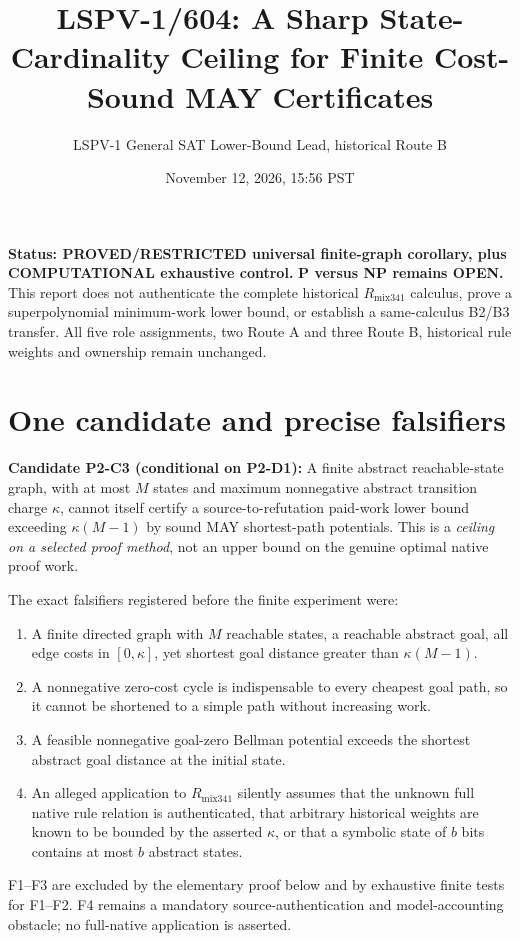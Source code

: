 \documentclass[11pt]{article}
\title{LSPV-1/604: A Sharp State-Cardinality Ceiling for Finite Cost-Sound MAY Certificates}
\author{LSPV-1 General SAT Lower-Bound Lead, historical Route B}
\date{November 12, 2026, 15:56 PST}
\begin{document}
\maketitle
\noindent\textbf{Status: PROVED/RESTRICTED universal finite-graph corollary, plus COMPUTATIONAL exhaustive control.}
\textbf{P versus NP remains OPEN.} This report does not authenticate the complete historical
$R_{\mathrm{mix341}}$ calculus, prove a superpolynomial minimum-work lower bound, or establish a same-calculus B2/B3 transfer.
All five role assignments, two Route A and three Route B, historical rule weights and ownership remain unchanged.

\section*{One candidate and precise falsifiers}
\textbf{Candidate P2-C3 (conditional on P2-D1):}
A finite abstract reachable-state graph, with at most $M$ states and maximum nonnegative abstract transition charge $\kappa$, cannot itself certify a source-to-refutation paid-work lower bound exceeding $\kappa(M-1)$ by sound MAY shortest-path potentials. This is a \emph{ceiling on a selected proof method}, not an upper bound on the genuine optimal native proof work.

The exact falsifiers registered before the finite experiment were:
\begin{enumerate}
\item[F1.] A finite directed graph with $M$ reachable states, a reachable abstract goal, all edge costs in $[0,\kappa]$, yet shortest goal distance greater than $\kappa(M-1)$.
\item[F2.] A nonnegative zero-cost cycle is indispensable to every cheapest goal path, so it cannot be shortened to a simple path without increasing work.
\item[F3.] A feasible nonnegative goal-zero Bellman potential exceeds the shortest abstract goal distance at the initial state.
\item[F4.] An alleged application to $R_{\mathrm{mix341}}$ silently assumes that the unknown full native rule relation is authenticated, that arbitrary historical weights are known to be bounded by the asserted $\kappa$, or that a symbolic state of $b$ bits contains at most $b$ abstract states.
\end{enumerate}
F1--F3 are excluded by the elementary proof below and by exhaustive finite tests for F1--F2. F4 remains a mandatory source-authentication and model-accounting obstacle; no full-native application is asserted.
\end{document}
